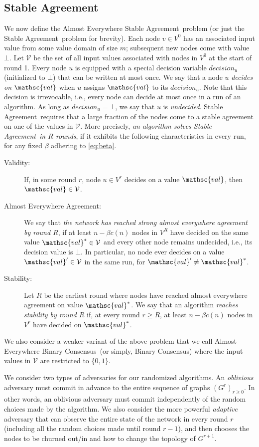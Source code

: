 \documentclass[leqno,11pt]{article}
\renewcommand{\geq}{\geqslant}
\renewcommand{\ge}{\geqslant}
\newcommand{\set}[1]{\{#1\}}
\newcommand{\val}{{\mathsc{val}}}
\newcommand{\V}{{\mathcal{V}}}
\newcommand{\sa}{{\sc Stable Agreement}}
\newcommand{\bc}{{\sc Binary Consensus}}
\begin{document}
\subsection{Stable Agreement} \label{sec:sa}
We now define the {\sc Almost Everywhere} \sa\ problem (or just the \sa\ problem for brevity). Each node $v \in V^0$ has an associated input
value from some value domain of size $m$; subsequent new nodes come with value $\bot$. 
Let $\V$ be the set of all input values associated with nodes in $V^0$ at the start of round
1. Every node $u$ is equipped with a special decision variable $decision_u$ (initialized to $\bot$) that can be written at
most once. We say that a node $u$ \emph{decides on $\val$} when $u$ assigns $\val$ to its $decision_u$. Note that this decision is
irrevocable, i.e., every node can decide at most once in a run of an algorithm. As long as $decision_u = \bot$, we say that $u$ is {\em undecided}.
\sa\ requires that a large fraction of the nodes come to a stable
agreement on one of the values in $\V$. More precisely, \emph{an algorithm solves
\sa\ in $R$ rounds}, if it exhibits the following characteristics in every run,
for any fixed $\beta$ adhering to \eqref{eq:beta}.
\begin{description}
\item[Validity:] If, in some round $r$, node $u \in V^r$ decides on a value
  $\val$, then $\val \in \V$. 
\item[Almost Everywhere Agreement:] We say that \emph{the network has
  reached strong almost everywhere agreement by round $R$}, if at least $n-\beta
  c(n)$ nodes in $V^R$ have decided on the same value $\val^* \in \V$ and every
  other node remains undecided, i.e., its decision value is $\bot$. In particular, no
  node ever decides on a value $\val'\in \V$ in the same run, for $\val'\ne\val^*$.
\item[Stability:] Let $R$ be the earliest round where nodes have reached almost
  everywhere agreement on value $\val^*$. We say that an algorithm \emph{reaches stability by round $R$} if, at every
  round $r \geq R$, at least $n-\beta c(n)$ nodes in $V^r$ have decided on
  $\val^*$.
\end{description}
We also consider a weaker variant of the above problem that we call 
{\sc Almost Everywhere} \bc\ (or simply, \bc) where
the input values in $\V$ are restricted to $\set{0,1}$.


We consider two types of adversaries for our randomized algorithms. An
\emph{oblivious} adversary  must commit in advance to the entire sequence of
graphs $(G^r)_{r\ge 0}$. In other
words, an oblivious adversary must commit independently of the random choices
made by the algorithm. 
We also consider the more powerful
  \emph{adaptive} adversary that can observe the entire state of the network in
  every round $r$ (including all the random choices made until  round $r-1$), and then chooses the nodes to be churned out/in and how to
  change the topology of $G^{r+1}$.
\end{document}
